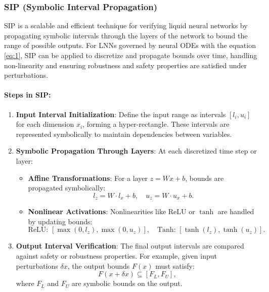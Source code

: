 \subsubsection{SIP (Symbolic Interval Propagation)}

SIP is a scalable and efficient technique for verifying liquid neural networks by propagating symbolic intervals through the layers of the network to bound the range of possible outputs. For LNNs governed by neural ODEs with the equation \ref{eq:1}, SIP can be applied to discretize and propagate bounds over time, handling non-linearity and ensuring robustness and safety properties are satisfied under perturbations.

\paragraph{Steps in SIP:}
\begin{enumerate}
    \item \textbf{Input Interval Initialization}:
    Define the input range as intervals \([l_i, u_i]\) for each dimension \(x_i\), forming a hyper-rectangle. These intervals are represented symbolically to maintain dependencies between variables.
    
    \item \textbf{Symbolic Propagation Through Layers}:
    At each discretized time step or layer:
    \begin{itemize}
        \item \textbf{Affine Transformations}:
        For a layer \(z = W x + b\), bounds are propagated symbolically:
        \[
        l_z = W \cdot l_x + b, \quad u_z = W \cdot u_x + b.
        \]
        \item \textbf{Nonlinear Activations}:
        Nonlinearities like ReLU or \(\tanh\) are handled by updating bounds:
        \[
        \text{ReLU: } [\max(0, l_z), \max(0, u_z)], \quad
        \text{Tanh: } [\tanh(l_z), \tanh(u_z)].
        \]
    \end{itemize}
    
    \item \textbf{Output Interval Verification}:
    The final output intervals are compared against safety or robustness properties. For example, given input perturbations \(\delta x\), the output bounds \(F(x)\) must satisfy:
    \[
    F(x + \delta x) \subseteq [F_L, F_U],
    \]
    where \(F_L\) and \(F_U\) are symbolic bounds on the output.
\end{enumerate}

